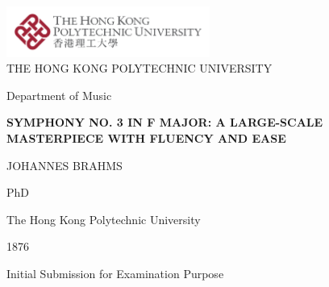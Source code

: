 \thispagestyle{empty}

\begin{center}

\vspace*{1cm}
\includegraphics[width=0.5\textwidth]{logo-name.pdf} \\

\vspace{2cm}
{\Large THE HONG KONG POLYTECHNIC UNIVERSITY}

\vspace{1cm}
{\large Department of Music}

\vspace{2cm}
{\Large \textbf{
SYMPHONY NO. 3 IN F MAJOR: A LARGE-SCALE MASTERPIECE WITH FLUENCY AND EASE
}}

\vspace{2cm}
{\Large JOHANNES BRAHMS}

\vspace{2cm}
{\large PhD}

\vspace{1cm}
{\large The Hong Kong Polytechnic University}

\vspace{1cm}

\vspace{1cm}
{\large 1876}

\vspace{1cm}
{\large Initial Submission for Examination Purpose}

\end{center}